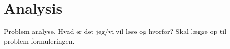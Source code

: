 \graphicspath{{figures/analysis/}}
\chapter{Analysis}\label{ch:analysis}
Problem analyse. Hvad er det jeg/vi vil løse og hvorfor? Skal lægge op til problem formuleringen.